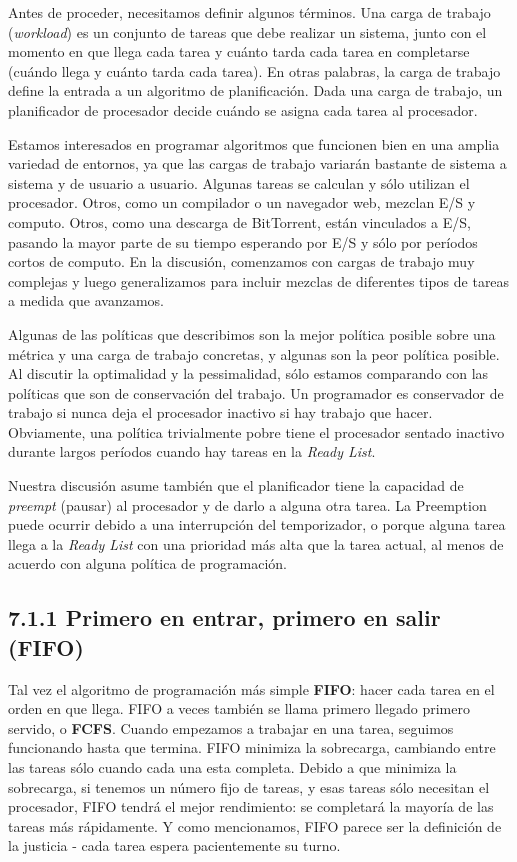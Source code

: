 \documentclass[10pt]{book}
\begin{document}
Antes de proceder, necesitamos definir algunos términos. Una carga de trabajo (\textit{workload}) es un conjunto de tareas que debe realizar un sistema, junto con el momento en que llega cada tarea y cuánto tarda cada tarea en completarse (cuándo llega y cuánto tarda cada tarea). En otras palabras, la carga de trabajo define la entrada a un algoritmo de planificación. Dada una carga de trabajo, un planificador de procesador decide cuándo se asigna cada tarea al procesador.

Estamos interesados en programar algoritmos que funcionen bien en una amplia variedad de entornos, ya que las cargas de trabajo variarán bastante de sistema a sistema y de usuario a usuario. Algunas tareas se calculan y sólo utilizan el procesador. Otros, como un compilador o un navegador web, mezclan E/S y computo. Otros, como una descarga de BitTorrent, están vinculados a E/S, pasando la mayor parte de su tiempo esperando por E/S y sólo por períodos cortos de computo. En la discusión, comenzamos con cargas de trabajo muy complejas y luego generalizamos para incluir mezclas de diferentes tipos de tareas a medida que avanzamos.

Algunas de las políticas que describimos son la mejor política posible sobre una métrica y una carga de trabajo concretas, y algunas son la peor política posible. Al discutir la optimalidad y la pessimalidad, sólo estamos comparando con las políticas que son de conservación del trabajo. Un programador es conservador de trabajo si nunca deja el procesador inactivo si hay trabajo que hacer. Obviamente, una política trivialmente pobre tiene el procesador sentado inactivo durante largos períodos cuando hay tareas en la \textit{Ready List}.

Nuestra discusión asume también que el planificador tiene la capacidad de \textit{preempt} (pausar) al procesador y de darlo a alguna otra tarea. La Preemption puede ocurrir debido a una interrupción del temporizador, o porque alguna tarea llega a la \textit{Ready List} con una prioridad más alta que la tarea actual, al menos de acuerdo con alguna política de programación.

\subsection{7.1.1 Primero en entrar, primero en salir (FIFO)}
Tal vez el algoritmo de programación más simple \textbf{FIFO}: hacer cada tarea en el orden en que llega. FIFO a veces también se llama primero llegado primero servido, o \textbf{FCFS}. Cuando empezamos a trabajar en una tarea, seguimos funcionando hasta que termina. FIFO minimiza la sobrecarga, cambiando entre las tareas sólo cuando cada una esta completa. Debido a que minimiza la sobrecarga, si tenemos un número fijo de tareas, y esas tareas sólo necesitan el procesador, FIFO tendrá el mejor rendimiento: se completará la mayoría de las tareas más rápidamente. Y como mencionamos, FIFO parece ser la definición de la justicia - cada tarea espera pacientemente su turno.
\end{document}
